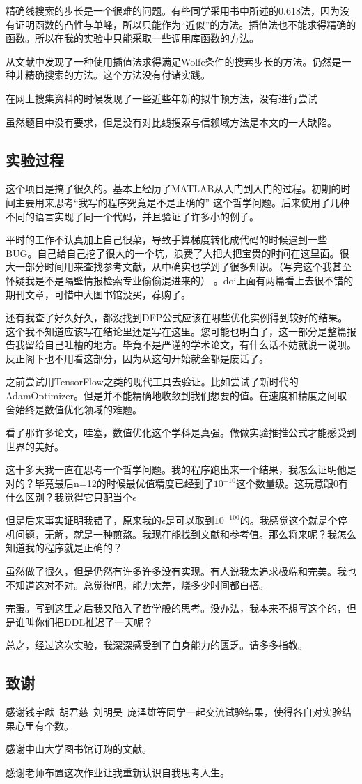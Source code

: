 \documentclass[11pt, a4paper]{article}
\begin{document}
精确线搜索的步长是一个很难的问题。有些同学采用书中\cite{高立2014数}所述的0.618法，因为没有证明函数的凸性与单峰，所以只能作为“近似”的方法。插值法也不能求得精确的函数。所以在我的实验中只能采取一些调用库函数的方法。

从文献\cite{Nocedal2006NO}中发现了一种使用插值法求得满足Wolfe条件的搜索步长的方法。仍然是一种非精确搜索的方法。这个方法没有付诸实践。

在网上搜集资料的时候发现了一些近些年新的拟牛顿方法\cite{WEI20061156}，没有进行尝试

虽然题目中没有要求，但是没有对比线搜索与信赖域方法是本文的一大缺陷。

\subsection{实验过程}
这个项目是搞了很久的。基本上经历了MATLAB从入门到入门的过程。初期的时间主要用来思考“我写的程序究竟是不是正确的”
这个哲学问题。后来使用了几种不同的语言实现了同一个代码，并且验证了许多小的例子。

平时的工作不认真加上自己很菜，导致手算梯度转化成代码的时候遇到一些BUG。自己给自己挖了很大的一个坑，浪费了大把大把宝贵的时间在这里面。很大一部分时间用来查找参考文献，从中确实也学到了很多知识。（写完这个我甚至怀疑我是不是隔壁情报检索专业偷偷混进来的）
。doi上面有两篇看上去很不错的期刊文章，可惜中大图书馆没买，荐购了。

还有我查了好久好久，都没找到DFP公式应该在哪些优化实例得到较好的结果。这个我不知道应该写在结论里还是写在这里。您可能也明白了，这一部分是整篇报告我留给自己吐槽的地方。毕竟不是严谨的学术论文，有什么话不妨就说一说呗。反正阁下也不用看这部分，因为从这句开始就全都是废话了。

之前尝试用TensorFlow之类的现代工具去验证。比如尝试了新时代的AdamOptimizer。但是并不能精确地收敛到我们想要的值。在速度和精度之间取舍始终是数值优化领域的难题。

看了那许多论文，哇塞，数值优化这个学科是真强。做做实验推推公式才能感受到世界的美好。

这十多天我一直在思考一个哲学问题。我的程序跑出来一个结果，我怎么证明他是对的？毕竟最后n=12的时候最优值精度已经到了$10^{-10}$这个数量级。这玩意跟0有什么区别？我觉得它只配当个$\epsilon$

但是后来事实证明我错了，原来我的$\epsilon$是可以取到$10^{-100}$的。我感觉这个就是个停机问题，无解，就是一种煎熬。我现在能找到文献和参考值。那么将来呢？我怎么知道我的程序就是正确的？

虽然做了很久，但是仍然有许多许多没有实现。有人说我太追求极端和完美。我也不知道这对不对。总觉得吧，能力太差，烧多少时间都白搭。

完蛋。写到这里之后我又陷入了哲学般的思考。没办法，我本来不想写这个的，但是谁叫你们把DDL推迟了一天呢？

总之，经过这次实验，我深深感受到了自身能力的匮乏。请多多指教。

\subsection{致谢}
感谢钱宇猷\ 胡君慈\ 刘明昊\ 庞泽雄等同学一起交流试验结果，使得各自对实验结果心里有个数。

感谢中山大学图书馆订购的文献。

感谢老师布置这次作业让我重新认识自我思考人生。



\end{document}

